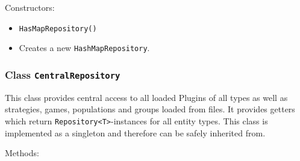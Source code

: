 \documentclass[parskip=full,11pt]{scrartcl}
\begin{document}
Constructors:

\begin{itemize} \itemsep -10pt
	\item \texttt{HasMapRepository()}
	\item[] Creates a new \texttt{HashMapRepository}.
\end{itemize}

\subsubsection{Class \texttt{CentralRepository}}

This class provides central access to all loaded Plugins of all types as well as strategies, games, populations and groups loaded from files. It provides getters which return \texttt{Repository<T>}-instances for all entity types. This class is implemented as a singleton and therefore can be safely inherited from. 

Methods:
\end{document}
